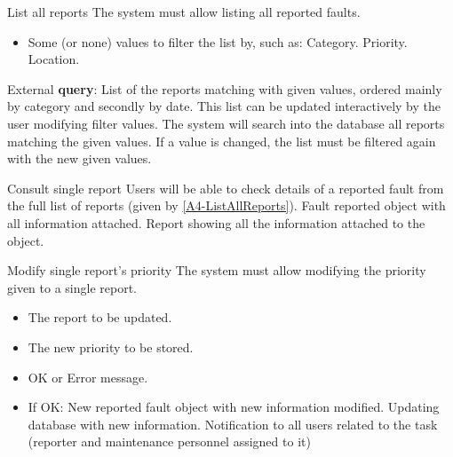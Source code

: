 \begin{requirement}{List all reports}\label{A4-ListAllReports}
\reqdesc The system must allow listing all reported faults.
\reqin 
\begin{itemize}
 	\item Some (or none) values to filter the list by, such as:
 		\subitem Category.
 		\subitem Priority.
 		\subitem Location.
 \end{itemize}
\reqout External \textbf{query}: List of the reports matching with given values, ordered mainly by category and secondly by date. This list can be updated interactively by the user modifying filter values.
\reqsteps The system will search into the database all reports matching the given values. If a value is changed, the list must be filtered again with the new given values.
\end{requirement}

\begin{requirement}{Consult single report}
\reqdesc Users will be able to check details of a reported fault from the full list of reports (given by \ref{A4-ListAllReports}).
\reqin Fault reported object with all information attached.
\reqout Report showing all the information attached to the object.
\end{requirement}

\begin{requirement}{Modify single report's priority}
\reqdesc The system must allow modifying the priority given to a single report. 
\reqin \begin{itemize}
\item The report to be updated.
\item The new priority to be stored.
\end{itemize}
\reqout \begin{itemize}
	\item OK or Error message.
	\item If OK:
	\subitem New reported fault object with new information modified.
	\subitem Updating database with new information.
	\subitem Notification to all users related to the task (reporter and maintenance personnel assigned to it)
\end{itemize}

\end{requirement}

